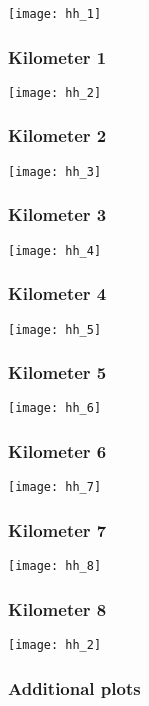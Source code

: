 \documentclass[]{article}
\begin{document}
\texttt{[image: hh\_1]}

\subsubsection{Kilometer 1}\label{kilometer-1-33}

\texttt{[image: hh\_2]}

\subsubsection{Kilometer 2}\label{kilometer-2-33}

\texttt{[image: hh\_3]}

\subsubsection{Kilometer 3}\label{kilometer-3-33}

\texttt{[image: hh\_4]}

\subsubsection{Kilometer 4}\label{kilometer-4-32}

\texttt{[image: hh\_5]}

\subsubsection{Kilometer 5}\label{kilometer-5-27}

\texttt{[image: hh\_6]}

\subsubsection{Kilometer 6}\label{kilometer-6-22}

\texttt{[image: hh\_7]}

\subsubsection{Kilometer 7}\label{kilometer-7-17}

\texttt{[image: hh\_8]}

\subsubsection{Kilometer 8}\label{kilometer-8-12}

\texttt{[image: hh\_2]}

\subsubsection{Additional plots}\label{additional-plots-33}
\end{document}
